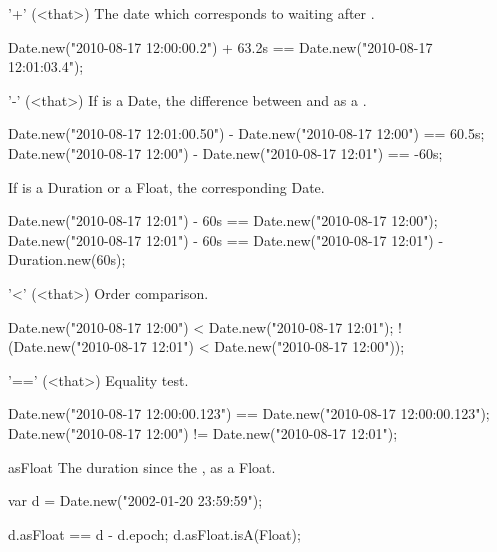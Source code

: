 \begin{urbiscriptapi}
\item['+'](<that>)%
  The date which corresponds to waiting  
  after \this.
\begin{urbiassert}
Date.new("2010-08-17 12:00:00.2") + 63.2s == Date.new("2010-08-17 12:01:03.4");
\end{urbiassert}


\item['-'](<that>)%
  If  is a Date, the difference between \this and  as a
  .
\begin{urbiassert}
Date.new("2010-08-17 12:01:00.50") - Date.new("2010-08-17 12:00") == 60.5s;
Date.new("2010-08-17 12:00")       - Date.new("2010-08-17 12:01") == -60s;
\end{urbiassert}

If  is a Duration or a Float, the corresponding Date.

\begin{urbiassert}
Date.new("2010-08-17 12:01") - 60s == Date.new("2010-08-17 12:00");
Date.new("2010-08-17 12:01") - 60s
  == Date.new("2010-08-17 12:01") - Duration.new(60s);
\end{urbiassert}


\item['<'](<that>)%
  Order comparison.
\begin{urbiassert}
   Date.new("2010-08-17 12:00") < Date.new("2010-08-17 12:01");
! (Date.new("2010-08-17 12:01") < Date.new("2010-08-17 12:00"));
\end{urbiassert}


\item['=='](<that>)%
  Equality test.
\begin{urbiassert}
Date.new("2010-08-17 12:00:00.123") == Date.new("2010-08-17 12:00:00.123");
Date.new("2010-08-17 12:00")        != Date.new("2010-08-17 12:01");
\end{urbiassert}


\item[asFloat] The duration since the , as a Float.
\begin{urbiassert}
var d = Date.new("2002-01-20 23:59:59");

d.asFloat == d - d.epoch;
d.asFloat.isA(Float);
\end{urbiassert}



\end{urbiscriptapi}
